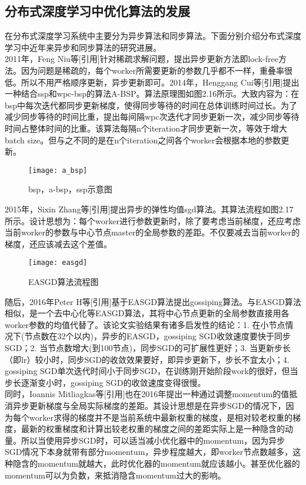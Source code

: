 \subsection{分布式深度学习中优化算法的发展}
在分布式深度学习系统中主要分为异步算法和同步算法。下面分别介绍分布式深度学习中近年来异步和同步算法的研究进展。\\
2011年，Feng Niu等[引用]针对稀疏求解问题，提出异步更新方法即lock-free方法。因为问题是稀疏的，每个worker所需要更新的参数几乎都不一样，重叠率很低。所以不用严格顺序更新，异步更新即可。2014年，Henggang Cui等[引用]提出一种结合ssp和wpc-bsp的算法A-BSP。算法原理图如图2.16所示。大致内容为：在bsp中每次迭代都同步更新梯度，使得同步等待的时间在总体训练时间过长。为了减少同步等待的时间比重，提出每间隔wpc次迭代才同步更新一次，减少同步等待时间占整体时间的比重。该算法每隔n个iteration才同步更新一次，等效于增大batch size。但与之不同的是在n个iteration之间各个worker会根据本地的参数更新。\\
\begin{figure}[htp]
\centering
\texttt{[image: a\_bsp]}
\caption{bsp，a-bsp，ssp示意图}
\end{figure}
2015年，Sixin Zhang等[引用]提出异步的弹性均值sgd算法。其算法流程如图2.17所示。设计思想为：每个worker进行参数更新时，除了要考虑当前梯度，还应考虑当前worker的参数与中心节点master的全局参数的差距。不仅要减去当前worker的梯度，还应该减去这个差值。
\begin{figure}[htp]
\centering
\texttt{[image: easgd]}
\caption{EASGD算法流程图}
\end{figure}
随后，2016年Peter H等[引用]基于EASGD算法提出gossiping算法。与EASGD算法相似，是一个去中心化等EASGD算法，其将中心节点更新的全局参数直接用各worker参数的均值代替了。该论文实验结果有诸多启发性的结论：1. 在小节点情况下(节点数在32个以内)，异步的EASGD，gossiping SGD收敛速度要快于同步SGD；2. 当节点数增大(到100节点)，同步SGD的可扩展性更好；3. 当更新步长（即lr）较小时，同步SGD的收敛效果要好，即异步更新下，步长不宜太小；4. gossiping SGD单次迭代时间小于同步SGD，在训练刚开始阶段work的很好，但当步长逐渐变小时，gossiping SGD的收敛速度变得很慢。\\
同时，Ioannis Mitliagkas等[引用]也在2016年提出一种通过调整momentum的值抵消异步更新梯度与全局实际梯度的差距。其设计思想是在异步SGD的情况下，因为每个worker求得的梯度并不是当前系统中最新权重的梯度，是相对较老权重的梯度，最新的权重梯度和计算出较老权重的梯度之间的差距实际上是一种隐含的动量。所以当使用异步SGD时，可以适当减小优化器中的momentum，因为异步SGD情况下本身就带有部分momentum，异步程度越大，即worker节点数越多，这种隐含的momentum就越大，此时优化器的momentum就应该越小。甚至优化器的momentum可以为负数，来抵消隐含momentum过大的影响。\\
